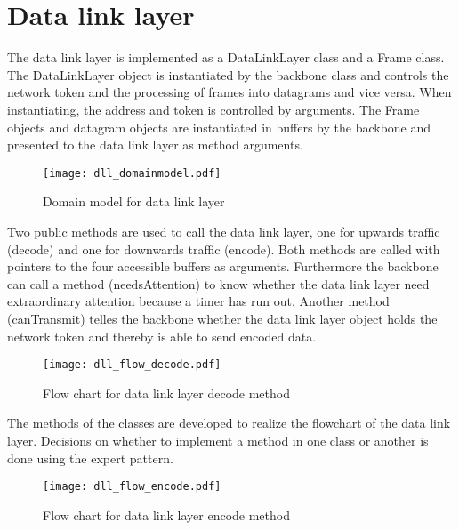 \section{Data link layer}
The data link layer is implemented as a DataLinkLayer class and a Frame class.
The DataLinkLayer object is instantiated by the backbone class and controls the
network token and the processing of frames into datagrams and vice versa. When
instantiating, the address and token is controlled by arguments. The Frame
objects and datagram objects are instantiated in buffers by the backbone and
presented to the data link layer as method arguments.

\begin{figure}[htb]
	\begin{center}
	\texttt{[image: dll\_domainmodel.pdf]}
	\caption{Domain model for data link layer}
	\label{fig:class_diag_for_datalink}	
	\end{center}
\end{figure}

Two public methods are used to call the data link layer, one for upwards traffic
(decode) and one for downwards traffic (encode). Both methods are called with
pointers to the four accessible buffers as arguments. Furthermore the backbone
can call a method (needsAttention) to know whether the data link layer need
extraordinary attention because a timer has run out. Another method
(canTransmit) telles the backbone whether the data link layer object holds the
network token and thereby is able to send encoded data.

\begin{figure}[htb]
	\begin{center}
	\texttt{[image: dll\_flow\_decode.pdf]}
	\caption{Flow chart for data link layer decode method}
	\label{fig:dll_flow_decode}	
	\end{center}
\end{figure}

The methods of the classes are developed to realize the flowchart of the data
link layer. Decisions on whether to implement a method in one class or another
is done using the expert pattern.

\begin{figure}[htb]
	\begin{center}
	\texttt{[image: dll\_flow\_encode.pdf]}
	\caption{Flow chart for data link layer encode method}
	\label{fig:dll_flow_encode}	
	\end{center}
\end{figure}
